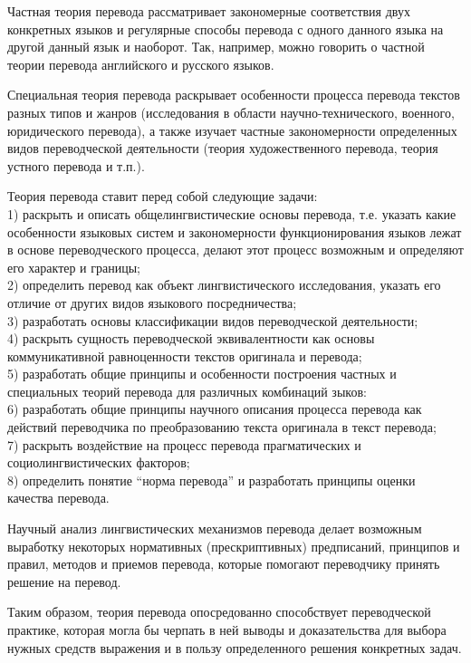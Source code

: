 Частная теория перевода рассматривает закономерные соответствия двух конкретных языков и регулярные способы перевода с одного данного языка на другой данный язык и наоборот. Так, например, можно говорить о частной теории перевода английского и русского языков.

Специальная теория перевода раскрывает особенности процесса перевода текстов разных типов и жанров (исследования в области научно-технического, военного, юридического перевода), а также изучает частные закономерности определенных видов переводческой деятельности (теория художественного перевода, теория устного перевода и т.п.).

Теория перевода ставит перед собой следующие задачи:
\\
1) раскрыть и описать общелингвистические основы перевода, т.е. указать какие особенности языковых систем и закономерности функционирования языков лежат в основе переводческого процесса, делают этот процесс возможным и определяют его характер и границы;
\\
2) определить перевод как объект лингвистического исследования, указать его отличие от других видов языкового посредничества;
\\
3) разработать основы классификации видов переводческой деятельности;
\\
4) раскрыть сущность переводческой эквивалентности как основы коммуникативной равноценности текстов оригинала и перевода;
\\
5) разработать общие принципы и особенности построения частных и специальных теорий перевода для различных комбинаций зыков:
\\
6) разработать общие принципы научного описания процесса перевода как действий переводчика по преобразованию текста оригинала в текст перевода;
\\
7) раскрыть воздействие на процесс перевода прагматических и социолингвистических факторов;
\\
8) определить понятие “норма перевода” и разработать принципы оценки качества перевода.

Научный анализ лингвистических механизмов перевода делает возможным выработку некоторых нормативных (прескриптивных) предписаний, принципов и правил, методов и приемов перевода, которые помогают переводчику принять решение на перевод.

Таким образом, теория перевода опосредованно способствует переводческой практике, которая могла бы черпать в ней выводы и доказательства для выбора нужных средств выражения и в пользу определенного решения конкретных задач.
